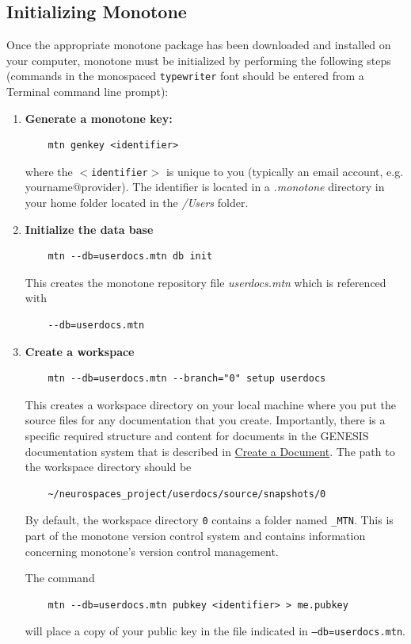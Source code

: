 \documentclass[12pt]{article}
\begin{document}
\subsection*{Initializing Monotone}

Once the appropriate monotone package has been downloaded and installed on your computer, monotone must be initialized by performing the following steps (commands in the monospaced {\tt typewriter} font should be entered from a Terminal command line prompt):

\begin{enumerate}

\item {\bf Generate a monotone key:} 
\begin{verbatim}
    mtn genkey <identifier>
\end{verbatim}
where the {\tt $<$identifier$>$} is unique to you (typically an email account, e.g. yourname@provider). The identifier is located in a {\it .monotone} directory in your home folder located in the {\it /Users} folder.

\item {\bf Initialize the data base}
\begin{verbatim}
    mtn --db=userdocs.mtn db init
\end{verbatim}
This creates the monotone repository file {\it userdocs.mtn} which is referenced with
\begin{verbatim}
    --db=userdocs.mtn
\end{verbatim}

\item {\bf Create a workspace}
\begin{verbatim}
    mtn --db=userdocs.mtn --branch="0" setup userdocs
\end{verbatim}
This creates a workspace directory on your local machine where you put the source files for any documentation that you create. Importantly, there is a specific required structure and content for documents in the GENESIS documentation system that is described in \href{../document-create/document-create.tex}{Create a Document}. The path to the workspace directory should be
\begin{verbatim}
    ~/neurospaces_project/userdocs/source/snapshots/0
\end{verbatim}
By default, the workspace directory {\tt 0} contains a folder named {\tt \_MTN}. This is part of the monotone version control system and contains information concerning monotone's version control management.

The command
\begin{verbatim}
    mtn --db=userdocs.mtn pubkey <identifier> > me.pubkey
\end{verbatim}
will place a copy of your public key in the file indicated in {\tt --db=userdocs.mtn}.
\end{enumerate}
\end{document}
